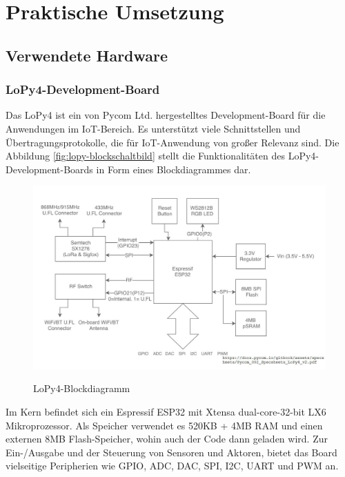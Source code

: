 
\chapter{Praktische Umsetzung} \label{Praktische Umsetzung}
\section{Verwendete Hardware} \label{Hardware}
\subsection{LoPy4-Development-Board} \label{LoPy4}

Das LoPy4 ist ein von Pycom Ltd. hergestelltes Development-Board für die Anwendungen im IoT-Bereich. Es unterstützt viele Schnittstellen und Übertragungsprotokolle, die für IoT-Anwendung von großer Relevanz sind. Die Abbildung \ref{fig:lopy-blockschaltbild} stellt die Funktionalitäten des LoPy4-Development-Boards in Form eines Blockdiagrammes  dar. 

\begin{figure}[h]
 \centering
 \includegraphics[width=1\textwidth]{pictures/blockdiagram_lopy}
 \caption[LoPy4-Blockdiagramm]{LoPy4-Blockdiagramm}\cite{Lopy2022}
 \label{fig:systemkonzept}
\end{figure}

Im Kern befindet sich ein Espressif ESP32 mit Xtensa dual-core-32-bit LX6 Mikroprozessor. Als Speicher verwendet es 520KB + 4MB RAM und einen externen 8MB Flash-Speicher, wohin auch der Code dann geladen wird. 
Zur Ein-/Ausgabe und der Steuerung von Sensoren und Aktoren, bietet das Board vielseitige Peripherien wie GPIO, ADC, DAC, SPI, I2C, UART und PWM an. 


